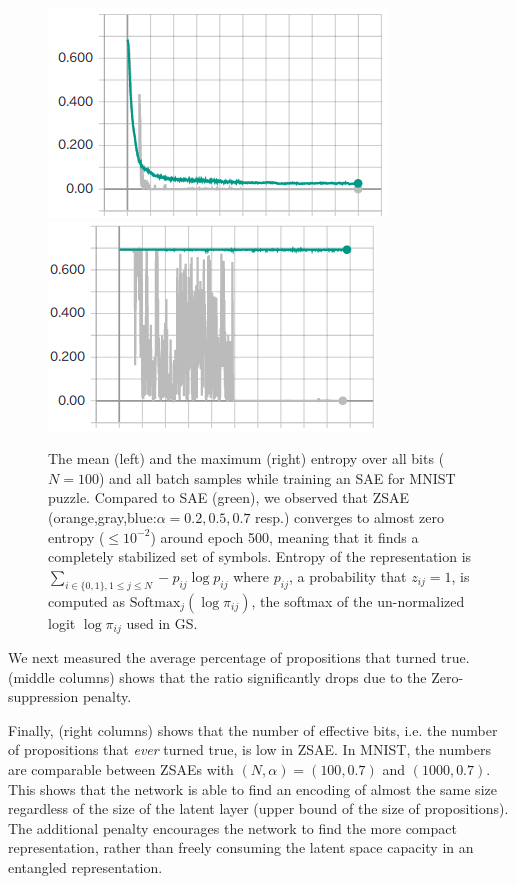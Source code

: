 \begin{figure}[htbp]
\centering
 \includegraphics[width=0.49\linewidth]{img/static/val-mean-entropy.png}
 \includegraphics[width=0.49\linewidth]{img/static/val-max-entropy.png}
 \caption{
The mean (left) and the maximum (right) entropy over all bits ($N=100$) and all batch samples
while training an SAE for MNIST puzzle.
Compared to SAE (green), we observed that ZSAE (orange,gray,blue:$\alpha=0.2,0.5,0.7$ resp.) converges to
almost zero entropy ($\leq 10^{-2}$) around epoch 500, meaning that it finds a completely
stabilized set of symbols.
% 
Entropy of the representation is $\sum_{i\in\{0,1\},1\leq j \leq N} -p_{ij}\log p_{ij}$ where
$p_{ij}$, a probability that $z_{ij}=1$, is computed as $\text{Softmax}_j(\log \pi_{ij})$,
the softmax of the un-normalized logit $\log \pi_{ij}$ used in GS.}
\label{ZSAE-entropy}
\end{figure}


We next measured the average percentage of propositions that turned true.
 (middle columns) shows that the ratio significantly drops due to the Zero-suppression penalty.

Finally,  (right columns) shows that the number of effective bits,
i.e. the number of propositions that \emph{ever} turned true, is low in ZSAE.
In MNIST, the numbers are comparable between ZSAEs with $(N,\alpha)=(100,0.7)$ and $(1000,0.7)$.
This shows that the network is able to find an encoding of almost the same size
regardless of the size of the latent layer (upper bound of the size of
propositions). The additional
penalty encourages the network to find the more compact representation,
rather than freely consuming the latent space capacity in an entangled representation.

